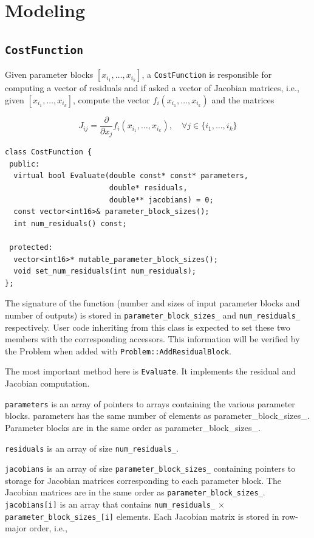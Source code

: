 \chapter{Modeling}
\label{chapter:api}
\section{\texttt{CostFunction}}
Given parameter blocks $\left[x_{i_1}, \hdots , x_{i_k}\right]$, a
\texttt{CostFunction} is responsible for computing
a vector of residuals and if asked a vector of Jacobian matrices, i.e., given $\left[x_{i_1}, \hdots , x_{i_k}\right]$, compute the vector $f_i\left(x_{i_1},\hdots,x_{i_k}\right)$ and the matrices

\begin{equation}
J_{ij} = \frac{\partial}{\partial x_{j}}f_i\left(x_{i_1},\hdots,x_{i_k}\right),\quad \forall j \in \{i_1,\hdots, i_k\}
\end{equation}
\begin{verbatim}
class CostFunction {
 public:
  virtual bool Evaluate(double const* const* parameters,
                        double* residuals,
                        double** jacobians) = 0;
  const vector<int16>& parameter_block_sizes();
  int num_residuals() const;

 protected:
  vector<int16>* mutable_parameter_block_sizes();
  void set_num_residuals(int num_residuals);
};
\end{verbatim}

The signature of the function (number and sizes of input parameter blocks and number of outputs)
is stored in \texttt{parameter\_block\_sizes\_} and \texttt{num\_residuals\_} respectively. User
code inheriting from this class is expected to set these two members with the
corresponding accessors. This information will be verified by the Problem
when added with \texttt{Problem::AddResidualBlock}.

The most important method here is \texttt{Evaluate}. It implements the residual and Jacobian computation.

\texttt{parameters}  is an array of pointers to arrays containing the various parameter blocks. parameters has the same number of elements as parameter\_block\_sizes\_.  Parameter blocks are in the same order as parameter\_block\_sizes\_.


\texttt{residuals} is an array of size \texttt{num\_residuals\_}.


\texttt{jacobians} is an array of size \texttt{parameter\_block\_sizes\_} containing pointers to storage for Jacobian matrices corresponding to each parameter block. The Jacobian matrices are in the same order as \texttt{parameter\_block\_sizes\_}. \texttt{jacobians[i]} is an array that contains \texttt{num\_residuals\_} $\times$ \texttt{parameter\_block\_sizes\_[i]} elements. Each Jacobian matrix is stored in row-major order, i.e.,

